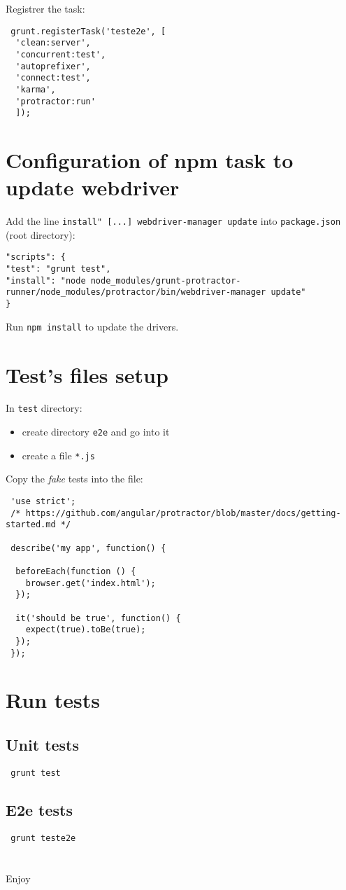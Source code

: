 \documentclass{report}
\begin{document}
Registrer the task:
\begin{verbatim}
 grunt.registerTask('teste2e', [
  'clean:server',
  'concurrent:test',
  'autoprefixer',
  'connect:test',
  'karma',
  'protractor:run'
  ]);
\end{verbatim}

\section*{Configuration of npm task to update webdriver}

Add the line \verb+install" [...] webdriver-manager update+ into \verb+package.json+ (root directory):

{\scriptsize
\begin{verbatim}
"scripts": {
"test": "grunt test",
"install": "node node_modules/grunt-protractor-runner/node_modules/protractor/bin/webdriver-manager update"
}
\end{verbatim}}

Run \verb+npm install+ to update the drivers.

\section*{Test's files setup}

In \verb+test+ directory:
\begin{itemize}
 \item create directory \verb+e2e+ and go into it
 \item create a file \verb+*.js+
\end{itemize}

Copy the \textit{fake} tests into the file:

\begin{verbatim}
 'use strict';
 /* https://github.com/angular/protractor/blob/master/docs/getting-started.md */
 
 describe('my app', function() {
 
  beforeEach(function () {
    browser.get('index.html');
  });
 
  it('should be true', function() {
    expect(true).toBe(true);
  }); 
 });
\end{verbatim}

\section*{Run tests}

\subsection*{Unit tests}

\begin{verbatim}
 grunt test
\end{verbatim}

\subsection*{E2e tests}

\begin{verbatim}
 grunt teste2e
\end{verbatim}


\section*{}
{\Huge\begin{center}
 Enjoy
\end{center}}
\end{document}
